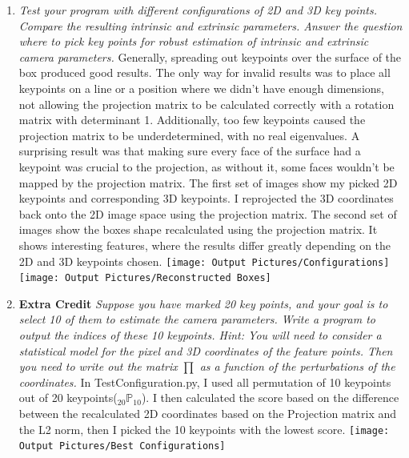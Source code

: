 \documentclass[11pt]{article}
\begin{document}
\begin{enumerate}
        \item \textit{Test your program with different configurations of 2D and 3D key points. Compare the resulting
        intrinsic and extrinsic parameters. Answer the question where to pick key points for robust estimation of
        intrinsic and extrinsic camera parameters.}\newline
        Generally, spreading out keypoints over the surface of the box produced good results. The only way for
        invalid results was to place all keypoints on a line or a position where we didn't have enough dimensions,
        not allowing the projection matrix to be calculated correctly with a rotation matrix with determinant 1.
        Additionally, too few keypoints caused the projection matrix to be underdetermined, with no real eigenvalues.
        A surprising result was that making sure every face of the surface had a keypoint was crucial to the projection,
        as without it, some faces wouldn't be mapped by the projection matrix.\newline
        The first set of images show my picked 2D keypoints and corresponding 3D keypoints. I reprojected the 3D
        coordinates back onto the 2D image space using the projection matrix. The second set of images show the boxes
        shape recalculated using the projection matrix. It shows interesting features, where the results differ
        greatly depending on the 2D and 3D keypoints chosen.\newline
        \texttt{[image: Output Pictures/Configurations]}\newline
        \texttt{[image: Output Pictures/Reconstructed Boxes]}\newline

        \item \textbf{Extra Credit} \textit{Suppose you have marked 20 key points, and your goal is to select 10 of
        them to estimate the camera parameters. Write a program to output the indices of these 10 keypoints. Hint:
        You will need to consider a statistical model for the pixel and 3D coordinates of the feature points. Then
        you need to write out the matrix $\prod$ as a function of the perturbations of the coordinates.}\newline
        In TestConfiguration.py, I used all permutation of 10 keypoints out of 20 keypoints($_{20}\mathbb{P}_{10}$).
        I then calculated the score based on the difference between the recalculated 2D coordinates based on the
        Projection matrix and the L2 norm, then I picked the 10 keypoints with the lowest score.\newline
        \texttt{[image: Output Pictures/Best Configurations]}\newline


\end{enumerate}
\end{document}
